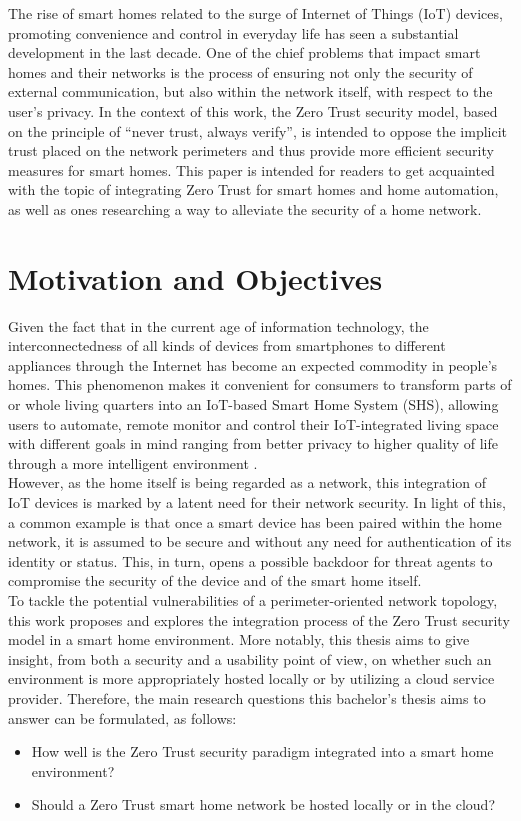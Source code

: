The rise of smart homes related to the surge of Internet of Things (IoT) devices, promoting convenience and control in everyday life \cite{chaurasia_enhanced_2019} has seen a substantial development in the last decade. One of the chief problems that impact smart homes and their networks is the process of ensuring not only the security of external communication, but also within the network itself, with respect to the user's privacy. In the context of this work, the Zero Trust security model, based on the principle of “never trust, always verify”, is intended to oppose the implicit trust placed on the network perimeters \cite{kang_theory_2023} and thus provide more efficient security measures for smart homes. This paper is intended for readers to get acquainted with the topic of integrating Zero Trust for smart homes and home automation, as well as ones researching a way to alleviate the security of a home network.
 
\section{Motivation and Objectives}
Given the fact that in the current age of information technology, the interconnectedness of all kinds of devices from smartphones to different appliances through the Internet has become an expected commodity in people's homes. This phenomenon makes it convenient for consumers to transform parts of or whole living quarters into an IoT-based Smart Home System (SHS), allowing users to automate, remote monitor and control their IoT-integrated living space with different goals in mind ranging from better privacy to higher quality of life through a more intelligent environment \cite{chakraborty_smart_2023}.\\
However, as the home itself is being regarded as a network, this integration of IoT devices is marked by a latent need for their network security. In light of this, a common example is that once a smart device has been paired within the home network, it is assumed to be secure and without any need for authentication of its identity or status. This, in turn, opens a possible backdoor for threat agents to compromise the security of the device and of the smart home itself.\\
To tackle the potential vulnerabilities of a perimeter-oriented network topology, this work proposes and explores the integration process of the Zero Trust security model in a smart home environment. More notably, this thesis aims to give insight, from both a security and a usability point of view, on whether such an environment is more appropriately hosted locally or by utilizing a cloud service provider.
Therefore, the main research questions this bachelor's thesis aims to answer can be formulated, as follows:
\begin{itemize}
    \item How well is the Zero Trust security paradigm integrated into a smart home environment?
    \item Should a Zero Trust smart home network be hosted locally or in the cloud?
\end{itemize}

